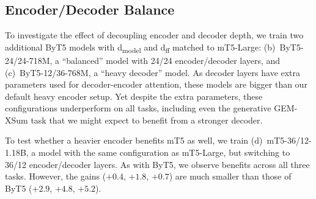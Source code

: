 \documentclass[11pt,a4paper]{article}
\begin{document}
\begin{table}[t!]
\centering
{}
\caption{Ablation model results across three tasks.}
\label{tab:ablation_results}
\end{table}

\subsection{Encoder/Decoder Balance}

To investigate the effect of decoupling encoder and decoder depth, we train two additional ByT5 models with d\textsubscript{model} and d\textsubscript{ff} matched to \mbox{mT5-Large}: (b)~ByT5-24/24-718M, a ``balanced'' model with 24/24 encoder/decoder layers, and (c)~ByT5-12/36-768M, a ``heavy decoder'' model. As decoder layers have extra parameters used for decoder-encoder attention, these models are bigger than our default heavy encoder setup. Yet despite the extra parameters, these configurations underperform on all tasks, including even the generative \mbox{GEM-XSum} task that we might expect to benefit from a stronger decoder.

To test whether a heavier encoder benefits mT5 as well, we train (d)~mT5-36/12-1.18B, a model with the same configuration as mT5-Large, but switching to 36/12 encoder/decoder layers. As with ByT5, we observe benefits across all three tasks. However, the gains ($+0.4$, $+1.8$, $+0.7$) are much smaller than those of ByT5 ($+2.9$, $+4.8$, $+5.2$).
\end{document}
